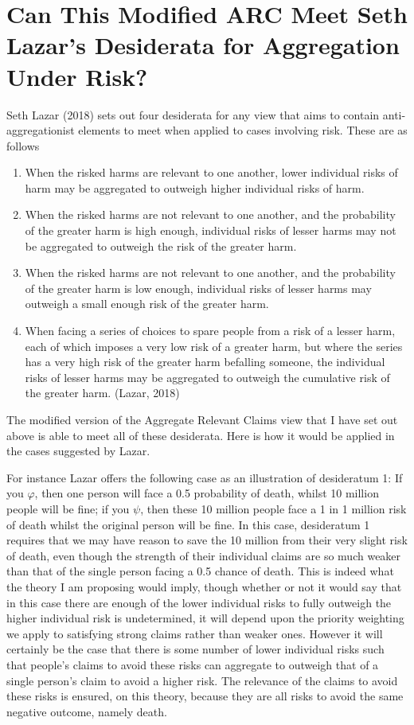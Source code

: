 \documentclass[man,11pt,a4paper]{apa7}
\begin{document}
\section{Can This Modified ARC Meet Seth Lazar's Desiderata for Aggregation Under Risk?}

Seth Lazar (2018) sets out four desiderata for any view that aims to contain anti-aggregationist elements to meet when applied to cases involving risk. These are as follows

\begin{enumerate}[label=\arabic*.]
\item When the risked harms are relevant to one another, lower individual risks of harm may be aggregated to outweigh higher individual risks of harm.
\item When the risked harms are not relevant to one another, and the probability of the greater harm is high enough, individual risks of lesser harms may not be aggregated to outweigh the risk of the greater harm.
\item When the risked harms are not relevant to one another, and the probability of the greater harm is low enough, individual risks of lesser harms may outweigh a small enough risk of the greater harm.
\item When facing a series of choices to spare people from a risk of a lesser harm, each of which imposes a very low risk of a greater harm, but where the series has a very high risk of the greater harm befalling someone, the individual risks of lesser harms may be aggregated to outweigh the cumulative risk of the greater harm. (Lazar, 2018)
\end{enumerate}

The modified version of the Aggregate Relevant Claims view that I have set out above is able to meet all of these desiderata. Here is how it would be applied in the cases suggested by Lazar.

For instance Lazar offers the following case as an illustration of desideratum 1: If you $\varphi$, then one person will face a 0.5 probability of death, whilst 10 million people will be fine; if you $\psi$, then these 10 million people face a 1 in 1 million risk of death whilst the original person will be fine. In this case, desideratum 1 requires that we may have reason to save the 10 million from their very slight risk of death, even though the strength of their individual claims are so much weaker than that of the single person facing a 0.5 chance of death. This is indeed what the theory I am proposing would imply, though whether or not it would say that in this case there are enough of the lower individual risks to fully outweigh the higher individual risk is undetermined, it will depend upon the priority weighting we apply to satisfying strong claims rather than weaker ones. However it will certainly be the case that there is some number of lower individual risks such that people's claims to avoid these risks can aggregate to outweigh that of a single person's claim to avoid a higher risk. The relevance of the claims to avoid these risks is ensured, on this theory, because they are all risks to avoid the same negative outcome, namely death.
\end{document}
